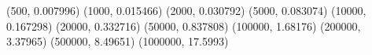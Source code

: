 (500, 0.007996) (1000, 0.015466) (2000, 0.030792) (5000, 0.083074) (10000, 0.167298) (20000, 0.332716) (50000, 0.837808) (100000, 1.68176) (200000, 3.37965) (500000, 8.49651) (1000000, 17.5993) 
